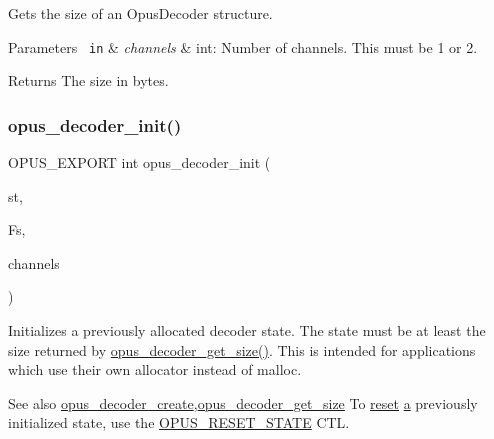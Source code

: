 Gets the size of an {\ttfamily Opus\+Decoder} structure. 
\begin{DoxyParams}[1]{Parameters}
\mbox{\texttt{ in}}  & {\em channels} & {\ttfamily int}\+: Number of channels. This must be 1 or 2. \\
\hline
\end{DoxyParams}
\begin{DoxyReturn}{Returns}
The size in bytes. 
\end{DoxyReturn}
\mbox{\label{group__opus__decoder_ga40746b48a7b1653987a3a6db2ce3a40b}} 
\subsubsection{\texorpdfstring{opus\_decoder\_init()}{opus\_decoder\_init()}}
{\footnotesize\ttfamily O\+P\+U\+S\+\_\+\+E\+X\+P\+O\+RT int opus\+\_\+decoder\+\_\+init (\begin{DoxyParamCaption}\item[{\mbox{\hyperlink{group__opus__decoder_ga401d8579958d36094715a6b90cd159a6}{Opus\+Decoder}} $\ast$}]{st,  }\item[{\mbox{\hyperlink{opus__types_8h_aa4d309d6f80b99dbabebc8f98879ab9a}{opus\+\_\+int32}}}]{Fs,  }\item[{int}]{channels }\end{DoxyParamCaption})}

Initializes a previously allocated decoder state. The state must be at least the size returned by \mbox{\hyperlink{group__opus__decoder_gaee52cd75f7160fda7a0916d72363940b}{opus\+\_\+decoder\+\_\+get\+\_\+size()}}. This is intended for applications which use their own allocator instead of malloc. \begin{DoxySeeAlso}{See also}
\mbox{\hyperlink{group__opus__decoder_ga6a06f16309dee5883c27223d127c4300}{opus\+\_\+decoder\+\_\+create}},\mbox{\hyperlink{group__opus__decoder_gaee52cd75f7160fda7a0916d72363940b}{opus\+\_\+decoder\+\_\+get\+\_\+size}} To \mbox{\hyperlink{_s_d_l__opengl__glext_8h_a11158672fb6a3f09183a338ecff59e41}{reset}} \mbox{\hyperlink{_s_d_l__opengl__glext_8h_a3309789fc188587d666cda5ece79cf82}{a}} previously initialized state, use the \mbox{\hyperlink{group__opus__genericctls_gadc74e4fa8bcdf9994187d52d92207337}{O\+P\+U\+S\+\_\+\+R\+E\+S\+E\+T\+\_\+\+S\+T\+A\+TE}} C\+TL. 
\end{DoxySeeAlso}

